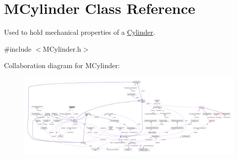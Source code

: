 \hypertarget{classMCylinder}{\section{M\+Cylinder Class Reference}
\label{classMCylinder}
}


Used to hold mechanical properties of a \hyperlink{classCylinder}{Cylinder}.  




{\ttfamily \#include $<$M\+Cylinder.\+h$>$}



Collaboration diagram for M\+Cylinder\+:
\nopagebreak
\begin{figure}[H]
\begin{center}
\leavevmode
\includegraphics[width=350pt]{classMCylinder__coll__graph}
\end{center}
\end{figure}
